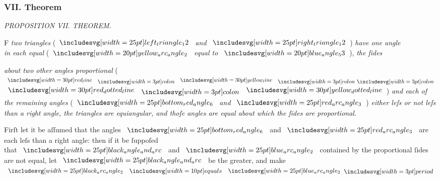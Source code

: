 \documentclass[12pt,preview]{standalone}
\begin{document}
\subsubsection{VII. Theorem}

\begin{minipage}[t]{0.33\textwidth}
    \vspace{40pt}
    
\end{minipage}%
\hfill
\begin{minipage}[t]{0.64\textwidth}
    \vspace{0pt}

    \begin{center}
        \textit{PROPOSITION VII. THEOREM.}\label{book6pr7} \\
    \end{center}

    \hfill

    \begin{center}
        \raggedright \lettrine[lines=4, loversize=1, nindent=0pt]{}{}F \textit{two triangles} (\hspace{-1ex}$\img{left_triangle_12}$ \textit{and} $\img{right_triangle_12}$\hspace{-1ex}) \textit{have one angle\\ in each equal} (\hspace{-1ex}$\img[0][0][20]{yellow_arc_angle_2}$ \textit{equal to} $\img[0][0][20]{blue_angle_53}$\hspace{-1ex}), \textit{the ſides}
    \end{center}
    \raggedright \textit{about two other angles proportional} (\hspace{-1ex}$\redline \bcolon \yellowline \bbcolon$  $\dottedredline \bcolon \dottedyellowline$\hspace{-1ex}) \textit{and each of the remaining angles} (\hspace{-1ex}$\img{bottom_red_angle_6}$ \textit{and} $\img{red_arc_angle_3}$\hspace{-1ex}) \textit{either leſs or not leſs than a right angle, the triangles are equiangular, and thoſe angles are equal about which the ſides are proportional}.

    \hfill

    \hfill

    \begin{center}
        Firſt let it be aſſumed that the angles $\img{bottom_red_angle_6}$ and $\img{red_arc_angle_3}$ are each leſs than a right angle: then if it be ſuppoſed\\
        that $\img{black_angle_and_arc}$ and $\img{blue_arc_angle_2}$ contained by the proportional ſides\\
        are not equal, let $\img{black_angle_and_arc}$ be the greater, and make\\
        $\img{black_arc_angle_2} \bequals \img{blue_arc_angle_2} \bperiod$
    \end{center}


\end{minipage}
\end{document}
